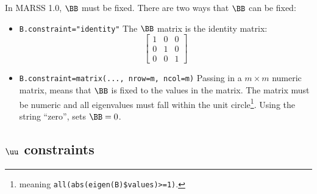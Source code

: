 In MARSS 1.0, $\BB$ must be fixed. There are two ways that $\BB$ can be fixed: 
\begin{itemize}\itemsep5pt
\item[] \texttt{B.constraint="identity"} The $\BB$ matrix is the identity matrix:
\begin{equation*}
 \left[ \begin{array}{ccc}
    1 & 0 & 0\\
    0 & 1 & 0 \\
    0 & 0 & 1 \end{array} \right]
\end{equation*}
\item[] \texttt{B.constraint=matrix(..., nrow=m, ncol=m)}  Passing in a $m \times m$ numeric matrix, means that $\BB$ is fixed to the values in the matrix. The matrix must be numeric and all eigenvalues must fall within the unit circle\footnote{meaning \texttt{all(abs(eigen(B)\$values)>=1)}.}.  Using the string ``zero'', sets $\BB=0$.
\end{itemize}

\subsection{$\uu$ constraints}

